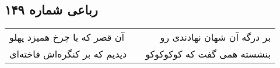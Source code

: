 \begin{center}
\section*{رباعی شماره ۱۴۹}
\label{sec:sh149}
\begin{longtable}{l p{0.5cm} r}
آن قصر که با چرخ همیزد پهلو
&&
بر درگه آن شهان نهادندی رو
\\
دیدیم که بر کنگره‌اش فاخته‌ای
&&
بنشسته همی گفت که کوکوکوکو
\\
\end{longtable}
\end{center}
